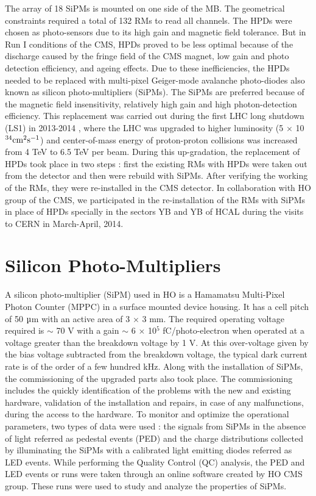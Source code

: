 The array of 18 SiPMs is mounted on one side of the MB. The geometrical constraints required a total of 132 RMs to read all channels. The HPDs were chosen as photo-sensors due to its high gain and magnetic field tolerance. But in Run I conditions of the CMS, HPDs proved to be less optimal because of the discharge caused by the fringe field of the CMS magnet, low gain and photo detection efficiency, and ageing effects. Due to these inefficiencies, the HPDs needed to be replaced with multi-pixel Geiger-mode avalanche photo-diodes also known as silicon photo-multipliers (SiPMs). The SiPMs are preferred because of the magnetic field insensitivity, relatively high gain and high photon-detection efficiency. This replacement was carried out during the first LHC long shutdown (LS1) in 2013-2014 \cite{Lutz:2012yoa}, where the LHC was upgraded to higher luminosity (5 $\times$ 10$^{34} {\rm cm}^2 {\rm s}^{-1}$) and center-of-mass energy of proton-proton collisions was increased from 4 TeV to 6.5 TeV per beam. During this up-gradation, the replacement of HPDs took place in two steps : first the existing RMs with HPDs were taken out from the detector and then were rebuild with SiPMs. After verifying the working of the RMs, they were re-installed in the CMS detector. In collaboration with HO group of the CMS, we participated in the re-installation of the RMs with SiPMs in place of HPDs specially in the sectors YB and YB of HCAL during the visits to CERN in March-April, 2014.

\section{Silicon Photo-Multipliers}
A silicon photo-multiplier (SiPM) used in HO is a Hamamatsu Multi-Pixel Photon Counter (MPPC) in a surface mounted device housing. It has a cell pitch of 50 $\micro$m with an active area of 3 $\times$ 3 mm. The required operating voltage required is $\sim$ 70 V with a gain $\sim$ 6 $\times$ 10$^5$ fC/photo-electron when operated at a voltage greater than the breakdown voltage by 1 V. At this over-voltage given by the bias voltage subtracted from the breakdown voltage, the typical dark current rate is of the order of a few hundred kHz. Along with the installation of SiPMs, the commissioning of the upgraded parts also took place. The commissioning includes the quickly identification of the problems with the new and existing hardware, validation of the installation and repairs, in case of any malfunctions, during the access to the hardware. To monitor and optimize the operational parameters, two types of data were used : the signals from SiPMs in the absence of light referred as pedestal events (PED) and the charge distributions collected by illuminating the SiPMs with a calibrated light emitting diodes referred as LED events. While performing the Quality Control (QC) analysis, the PED and LED events or runs were taken through an online software created by HO CMS group. These runs were used to study and analyze the properties of SiPMs. 

